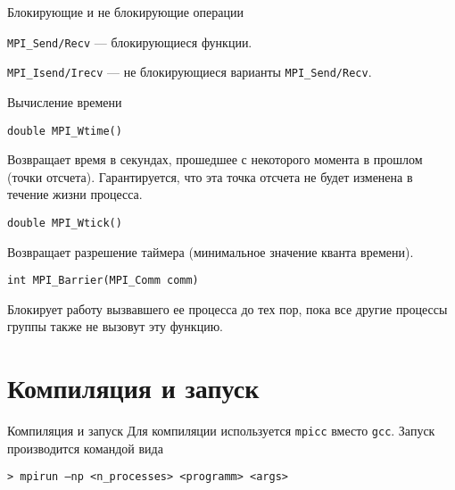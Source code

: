 \begin{frame}{Блокирующие и не блокирующие операции}

\texttt{MPI_Send/Recv} --- блокирующиеся функции.

\begin{figure}
\centering
{}
\end{figure}

\texttt{MPI_Isend/Irecv} --- не блокирующиеся варианты \texttt{MPI_Send/Recv}.

\end{frame}

\begin{frame}[fragile]{Вычисление времени}

\begin{lstlisting}
double MPI_Wtime()
\end{lstlisting}

Возвращает время в секундах, прошедшее с  некоторого момента в прошлом (точки отсчета). Гарантируется, что эта точка отсчета не будет изменена в течение жизни процесса.

\begin{lstlisting}
double MPI_Wtick()
\end{lstlisting}

Возвращает разрешение таймера (минимальное значение кванта времени).

\begin{lstlisting}
int MPI_Barrier(MPI_Comm comm)
\end{lstlisting}

Блокирует работу вызвавшего ее процесса до тех пор, пока все другие процессы группы также не вызовут эту функцию.

\end{frame}

\section{Компиляция и запуск}

\begin{frame}[fragile]{Компиляция и запуск}
Для компиляции используется \texttt{mpicc} вместо \texttt{gcc}.
\vfill
Запуск производится командой вида

\begin{lstlisting}
> mpirun –np <n_processes> <programm> <args>
\end{lstlisting}
\end{frame}

